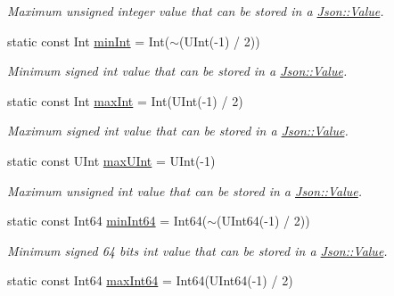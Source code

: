 \begin{DoxyCompactItemize}
\begin{DoxyCompactList}\small\item\em Maximum unsigned integer value that can be stored in a \hyperlink{class_json_1_1_value}{Json\+::\+Value}. \end{DoxyCompactList}\item 
\hypertarget{class_json_1_1_value_a7df8a39e2502b8c92a6a41e3d752d2c8}{}static const Int \hyperlink{class_json_1_1_value_a7df8a39e2502b8c92a6a41e3d752d2c8}{min\+Int} = Int($\sim$(U\+Int(-\/1) / 2))\label{class_json_1_1_value_a7df8a39e2502b8c92a6a41e3d752d2c8}

\begin{DoxyCompactList}\small\item\em Minimum signed int value that can be stored in a \hyperlink{class_json_1_1_value}{Json\+::\+Value}. \end{DoxyCompactList}\item 
\hypertarget{class_json_1_1_value_a978c799a8af3114ef7dab6fd0a310a1b}{}static const Int \hyperlink{class_json_1_1_value_a978c799a8af3114ef7dab6fd0a310a1b}{max\+Int} = Int(U\+Int(-\/1) / 2)\label{class_json_1_1_value_a978c799a8af3114ef7dab6fd0a310a1b}

\begin{DoxyCompactList}\small\item\em Maximum signed int value that can be stored in a \hyperlink{class_json_1_1_value}{Json\+::\+Value}. \end{DoxyCompactList}\item 
\hypertarget{class_json_1_1_value_ac79e63ee68d3aa914bfd6988be669b87}{}static const U\+Int \hyperlink{class_json_1_1_value_ac79e63ee68d3aa914bfd6988be669b87}{max\+U\+Int} = U\+Int(-\/1)\label{class_json_1_1_value_ac79e63ee68d3aa914bfd6988be669b87}

\begin{DoxyCompactList}\small\item\em Maximum unsigned int value that can be stored in a \hyperlink{class_json_1_1_value}{Json\+::\+Value}. \end{DoxyCompactList}\item 
\hypertarget{class_json_1_1_value_a815ef899bc312c93bc426511acfe31a7}{}static const Int64 \hyperlink{class_json_1_1_value_a815ef899bc312c93bc426511acfe31a7}{min\+Int64} = Int64($\sim$(U\+Int64(-\/1) / 2))\label{class_json_1_1_value_a815ef899bc312c93bc426511acfe31a7}

\begin{DoxyCompactList}\small\item\em Minimum signed 64 bits int value that can be stored in a \hyperlink{class_json_1_1_value}{Json\+::\+Value}. \end{DoxyCompactList}\item 
\hypertarget{class_json_1_1_value_a4492634870b8c5709ce967b384ac6006}{}static const Int64 \hyperlink{class_json_1_1_value_a4492634870b8c5709ce967b384ac6006}{max\+Int64} = Int64(U\+Int64(-\/1) / 2)\label{class_json_1_1_value_a4492634870b8c5709ce967b384ac6006}


\end{DoxyCompactItemize}
